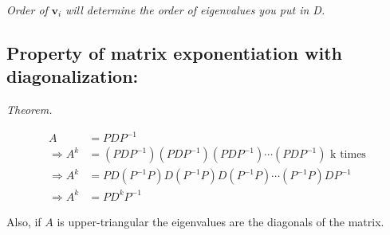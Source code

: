 \documentclass[
]{article}
\begin{document}
\emph{Order of} ${\mathbf{v}}_{i}$ \emph{will determine the order
of eigenvalues you put in D.}


\subsection{Property of matrix exponentiation with
diagonalization:}

\emph{Theorem.}

\begin{align*}
A &= PDP^{- 1}
 \\
\Rightarrow A^{k} &= \left( PDP^{- 1} \right)\left( PDP^{- 1} \right)\left( PDP^{- 1} \right)\cdots\left( PDP^{- 1} \right)\text{\ k\ }\text{times}
 \\
\Rightarrow A^{k} &= PD\left( P^{- 1}P \right)D\left( P^{- 1}P \right)D\left( P^{- 1}P \right)\cdots\left( P^{- 1}P \right)DP^{- 1}
 \\
\Rightarrow A^{k} &= PD^{k}P^{- 1}
\end{align*}


Also, if $A$ is upper-triangular the eigenvalues are the diagonals of
the matrix.
\end{document}
